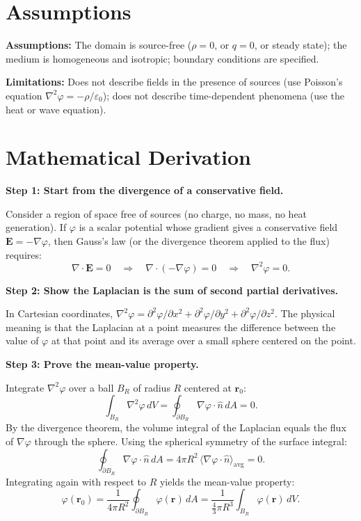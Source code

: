 \section*{Assumptions}

\textbf{Assumptions:} The domain is source-free ($\rho = 0$, or $q = 0$, or steady state); the medium is homogeneous and isotropic; boundary conditions are specified.


\textbf{Limitations:} Does not describe fields in the presence of sources (use Poisson's equation $\nabla^{2}\varphi = -\rho/\varepsilon_{0}$); does not describe time-dependent phenomena (use the heat or wave equation).


\section*{Mathematical Derivation}

\textbf{Step 1: Start from the divergence of a conservative field.}

Consider a region of space free of sources (no charge, no mass, no heat generation). If $\varphi$ is a scalar potential whose gradient gives a conservative field $\mathbf{E} = -\nabla\varphi$, then Gauss's law (or the divergence theorem applied to the flux) requires:
\begin{equation}
\nabla\cdot\mathbf{E} = 0 \quad\Longrightarrow\quad \nabla\cdot(-\nabla\varphi) = 0 \quad\Longrightarrow\quad \nabla^{2}\varphi = 0.
\end{equation}

\textbf{Step 2: Show the Laplacian is the sum of second partial derivatives.}

In Cartesian coordinates, $\nabla^{2}\varphi = \partial^{2}\varphi/\partial x^{2} + \partial^{2}\varphi/\partial y^{2} + \partial^{2}\varphi/\partial z^{2}$. The physical meaning is that the Laplacian at a point measures the difference between the value of $\varphi$ at that point and its average over a small sphere centered on the point.

\textbf{Step 3: Prove the mean-value property.}

Integrate $\nabla^{2}\varphi$ over a ball $B_R$ of radius $R$ centered at $\mathbf{r}_0$:
\begin{equation}
\int_{B_R} \nabla^{2}\varphi\,dV = \oint_{\partial B_R} \nabla\varphi\cdot\hat{n}\,dA = 0.
\end{equation}
By the divergence theorem, the volume integral of the Laplacian equals the flux of $\nabla\varphi$ through the sphere. Using the spherical symmetry of the surface integral:
\begin{equation}
\oint_{\partial B_R} \nabla\varphi\cdot\hat{n}\,dA = 4\pi R^{2}\,\langle\nabla\varphi\cdot\hat{n}\rangle_{\text{avg}} = 0.
\end{equation}
Integrating again with respect to $R$ yields the mean-value property:
\begin{equation}
\varphi(\mathbf{r}_0) = \frac{1}{4\pi R^{2}}\oint_{\partial B_R} \varphi(\mathbf{r})\,dA = \frac{1}{\frac{4}{3}\pi R^{3}}\int_{B_R} \varphi(\mathbf{r})\,dV.
\end{equation}

